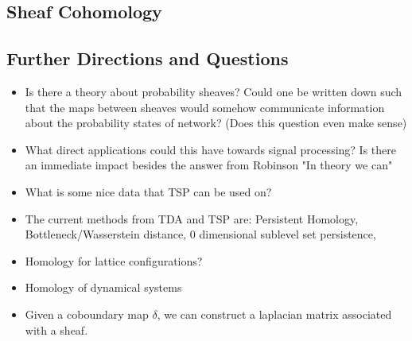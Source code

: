\documentclass[12pt]{article}
\begin{document}
\subsection{Sheaf Cohomology}

\subsection{Further Directions and Questions}

\begin{itemize}
  \item Is there a theory about probability sheaves? Could one be written down such that
    the maps between sheaves would somehow communicate information about the probability 
    states of network? (Does this question even make sense)

  \item What direct applications could this have towards signal processing? Is there an immediate
    impact besides the answer from Robinson "In theory we can"

  \item What is some nice data that TSP can be used on?

  \item The current methods from TDA and TSP are: Persistent Homology, Bottleneck/Wasserstein distance, 
    0 dimensional sublevel set persistence, 

  \item Homology for lattice configurations?

  \item Homology of dynamical systems

  \item Given a coboundary map $\delta$, we can construct a laplacian matrix associated with a sheaf.

\end{itemize}
\end{document}
